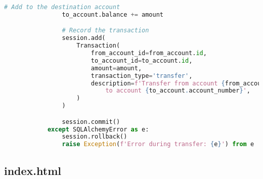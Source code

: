 \begin{lstlisting}[language=Python]
				# Add to the destination account
				to_account.balance += amount

				# Record the transaction
				session.add(
					Transaction(
						from_account_id=from_account.id,
						to_account_id=to_account.id,
						amount=amount,
						transaction_type='transfer',
						description=f'Transfer from account {from_account.account_number} \
							to account {to_account.account_number}',
					)
				)

				session.commit()
			except SQLAlchemyError as e:
				session.rollback()
				raise Exception(f'Error during transfer: {e}') from e
\end{lstlisting}

\subsection{index.html}
